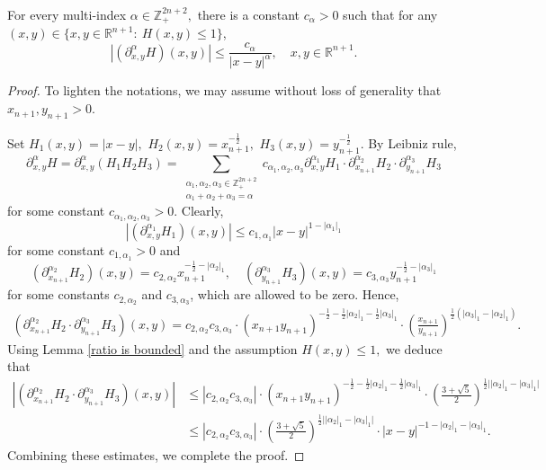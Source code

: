 \documentclass[12pt]{amsart}
\begin{document}
\begin{lemma}\label{H derivatives lemma} For every multi-index $\alpha\in\mathbb{Z}^{2n+2}_+,$ there is a constant $c_\alpha>0$ such that for any $(x,y)\in \{x,y\in\mathbb{R}^{n+1}:\ H(x,y)\leq 1\}$,
$$|(\partial_{x,y}^{\alpha}H)(x,y)|\leq\frac{c_{\alpha}}{|x-y|^{\alpha}},\quad x,y\in\mathbb{R}^{n+1}.$$
\end{lemma}
\begin{proof} To lighten the notations, we may assume without loss of generality that $x_{n+1},y_{n+1}>0.$

Set $H_1(x,y)=|x-y|,$ $H_2(x,y)=x_{n+1}^{-\frac12},$ $H_3(x,y)=y_{n+1}^{-\frac12}.$ By Leibniz rule,
$$\partial_{x,y}^{\alpha}H=\partial_{x,y}^{\alpha}(H_1H_2H_3)=\sum_{\substack{\alpha_1,\alpha_2,\alpha_3\in\mathbb{Z}_+^{2n+2}\\ \alpha_1+\alpha_2+\alpha_3=\alpha}}c_{\alpha_1,\alpha_2,\alpha_3}\partial_{x,y}^{\alpha_1}H_1\cdot\partial_{x_{n+1}}^{\alpha_2}H_2\cdot\partial_{y_{n+1}}^{\alpha_3}H_3$$
for some constant $c_{\alpha_1,\alpha_2,\alpha_3}>0$. Clearly,
$$|(\partial_{x,y}^{\alpha_1}H_1)(x,y)|\leq c_{1,\alpha_1}|x-y|^{1-|\alpha_1|_1}$$
for some constant $c_{1,\alpha_1}>0$ and
$$(\partial_{x_{n+1}}^{\alpha_2}H_2)(x,y)=c_{2,\alpha_2}x_{n+1}^{-\frac12-|\alpha_2|_1},\quad (\partial_{y_{n+1}}^{\alpha_3}H_3)(x,y)=c_{3,\alpha_3}y_{n+1}^{-\frac12-|\alpha_3|_1}$$
for some constants $c_{2,\alpha_2}$ and $c_{3,\alpha_3}$, which are allowed to be zero.  Hence,
\begin{align*}
(\partial_{x_{n+1}}^{\alpha_2}H_2\cdot\partial_{y_{n+1}}^{\alpha_3}H_3)(x,y)
=c_{2,\alpha_2}c_{3,\alpha_3}\cdot (x_{n+1}y_{n+1})^{-\frac12-\frac12|\alpha_2|_1-\frac12|\alpha_3|_1}\cdot (\frac{x_{n+1}}{y_{n+1}})^{\frac12(|\alpha_3|_1-|\alpha_2|_1)}.
\end{align*}
Using Lemma \ref{ratio is bounded} and the assumption $H(x,y)\leq 1,$ we deduce that
\begin{align*}
|(\partial_{x_{n+1}}^{\alpha_2}H_2\cdot\partial_{y_{n+1}}^{\alpha_3}H_3)(x,y)|
&\leq |c_{2,\alpha_2}c_{3,\alpha_3}|\cdot (x_{n+1}y_{n+1})^{-\frac12-\frac12|\alpha_2|_1-\frac12|\alpha_3|_1}\cdot (\frac{3+\sqrt{5}}{2})^{\frac12\big||\alpha_2|_1-|\alpha_3|_1\big|}\\
&\leq |c_{2,\alpha_2}c_{3,\alpha_3}|\cdot (\frac{3+\sqrt{5}}{2})^{\frac12\big||\alpha_2|_1-|\alpha_3|_1\big|}\cdot |x-y|^{-1-|\alpha_2|_1-|\alpha_3|_1}.
\end{align*}	
Combining these estimates, we complete the proof.
\end{proof}
\end{document}
